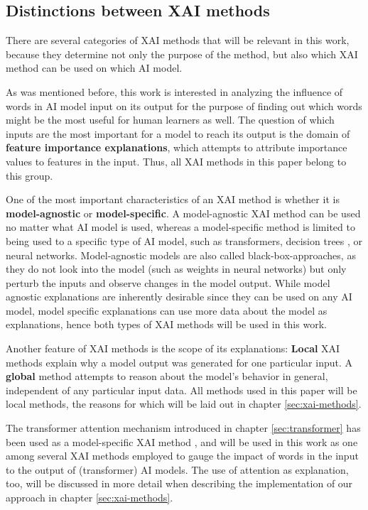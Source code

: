 \subsection{Distinctions between XAI methods}
There are several categories of XAI methods that will be relevant in this work, because they determine not only the purpose of the method, but also which XAI method can be used on which AI model.

As was mentioned before, this work is interested in analyzing the influence of words in AI model input on its output for the purpose of finding out which words might be the most useful for human learners as well.
The question of which inputs are the most important for a model to reach its output is the domain of \textbf{feature importance explanations}, which attempts to attribute importance values to features in the input.
Thus, all XAI methods in this paper belong to this group.

One of the most important characteristics of an XAI method is whether it is \textbf{model-agnostic} or \textbf{model-specific}.
A model-agnostic XAI method can be used no matter what AI model is used, whereas a model-specific method is limited to being used to a specific type of AI model, such as transformers, decision trees , or neural networks.
Model-agnostic models are also called black-box-approaches, as they do not look into the model (such as weights in neural networks) but only perturb the inputs and observe changes in the model output.
While model agnostic explanations are inherently desirable since they can be used on any AI model, model specific explanations can use more data about the model as explanations, hence both types of XAI methods will be used in this work.

Another feature of XAI methods is the scope of its explanations:
\textbf{Local} XAI methods explain why a model output was generated for one particular input.
A \textbf{global} method attempts to reason about the model's behavior in general, independent of any particular input data.
All methods used in this paper will be local methods, the reasons for which will be laid out in chapter \ref{sec:xai-methods}.

The transformer attention mechanism introduced in chapter \ref{sec:transformer} has been used as a model-specific XAI method
, and will be used in this work as one among several XAI methods employed to gauge the impact of words in the input to the output of (transformer) AI models.
The use of attention as explanation, too, will be discussed in more detail when describing the implementation of our approach in chapter \ref{sec:xai-methods}.



